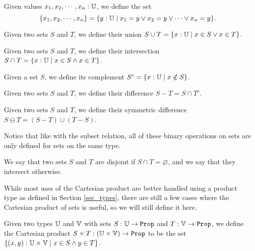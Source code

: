 \documentclass[../math.tex]{subfiles}
\begin{document}
\begin{definition}
    Given values $x_1, x_2, \cdots, x_n : \mathbb{U}$, we define the set
    \[
        \{x_1, x_2, \cdots, x_n\} =
        \{y : \mathbb{U} \mid x_1 = y \vee x_2 = y \vee \cdots \vee x_n = y\}.
    \]
\end{definition}

\begin{definition}
    Given two sets $S$ and $T$, we define their union $S \cup T = \{x : \mathbb{U} \mid
    x \in S \vee x \in T\}$.
\end{definition}

\begin{definition}
    Given two sets $S$ and $T$, we define their intersection $S \cap T = \{x :
    \mathbb{U} \mid x \in S \wedge x \in T\}$.
\end{definition}

\begin{definition}
    Given a set $S$, we define its complement $S^c = \{x : \mathbb{U} \mid x \notin
    S\}$.
\end{definition}

\begin{definition}
    Given two sets $S$ and $T$, we define their difference $S - T = S \cap T^c$.
\end{definition}

\begin{definition}
    Given two sets $S$ and $T$, we define their symmetric difference $S \ominus
    T = (S - T) \cup (T - S)$.
\end{definition}
\noindent Notice that like with the subset relation, all of these binary
operations on sets are only defined for sets on the same type.

\begin{definition}
    We say that two sets $S$ and $T$ are disjoint if $S \cap T = \varnothing$,
    and we say that they intersect otherwise.
\end{definition}

While most uses of the Cartesian product are better handled using a product type
as defined in Section \ref{sec_types}, there are still a few cases where the
Cartesian product of sets is useful, so we will still define it here.
\begin{definition}
    Given two types $\mathbb{U}$ and $\mathbb{V}$ with sets $S : \U \to \Prop$ and $T : \V \to
    \Prop$, we define the Cartesian product $S \times T : (\U \times \V) \to
    \Prop$ to be the set $\{(x, y) : \mathbb{U} \times \mathbb{V} \mid x \in S \wedge y \in
    T\}$.
\end{definition}
\end{document}
